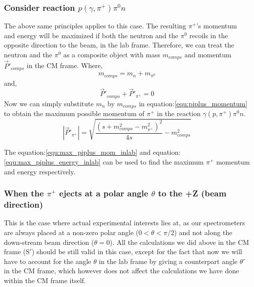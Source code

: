 \subsubsection{Consider reaction $p(\gamma,\pi^{+})\pi^0n$}

The above same principles applies to this case. The resulting $\pi^+$'s momentum and energy will be maximized if both the neutron and the $\pi^0$ recoils in the opposite direction to the beam, in the lab frame. Therefore, we can treat the neutron and the $\pi^0$ as a composite object with mass $m_{comps}$ and momentum $\vec{P}'_{comps}$ in the CM frame. Where,
\begin{equation}
    m_{comps} = m_n + m_{\pi^0}
\end{equation}
and,
\begin{equation}
    \vec{P}'_{comps} + \vec{P}'_{\pi^+} = 0
\end{equation}
Now we can simply substitute $m_n$ by $m_{comps}$ in equation:\ref{equ:piplus_momentum} to obtain the maximum possible momentum of $\pi^+$ in the reaction $\gamma(p,\pi^{+})\pi^0n$.
\begin{equation}
    |\vec{P}'_{\pi^+}| = \sqrt{\frac{(s+m_{comps}^2-m_{\pi^+}^2)^2}{4s} - m_{comps}^2}  
  \label{equ:piplus_momentum_2pi}  
\end{equation}

 The equation:\ref{equ:max_piplus_mom_inlab} and equation:\ref{equ:max_piplus_energy_inlab} can be used to find the maximum $\pi^+$ momentum and energy respectively.



\subsubsection{When the $\pi^+$ ejects at a polar angle $\theta$ to the +Z (beam direction)}

This is the case where actual experimental interests lies at, as our spectrometers are always placed at a non-zero polar angle ($0<\theta<\pi/2$) and not along the down-stream beam direction ($\theta = 0$). All the calculations we did above in the CM frame (S$'$) should be still valid in this case, except for the fact that now we will have to account for the angle $\theta$ in the lab frame by giving a counterpart angle $\theta'$ in the CM frame, which however does not affect the calculations we have done within the CM frame itself.


